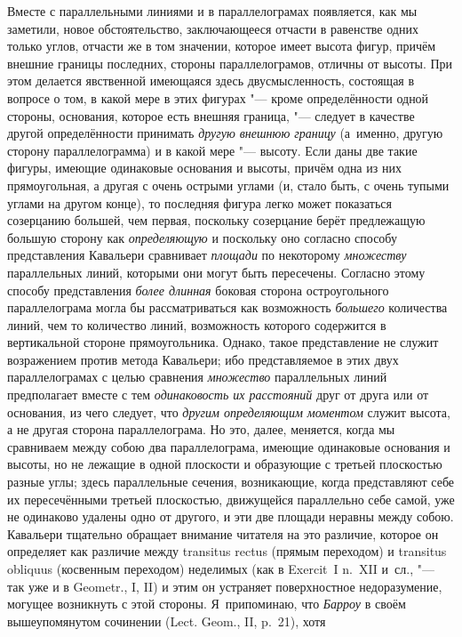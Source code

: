 Вместе с параллельными линиями и в параллелограмах появляется, как мы заметили,
новое обстоятельство, заключающееся отчасти в равенстве одних только углов,
отчасти же в том значении, которое имеет высота фигур, причём внешние границы
последних, стороны параллелограмов, отличны от высоты. При этом делается
явственной имеющаяся здесь двусмысленность, состоящая в вопросе о том, в какой
мере в этих фигурах "--- кроме определённости одной стороны, основания, которое
есть внешняя граница, "--- следует в качестве другой определённости принимать
{\em другую внешнюю границу} (а~именно, другую сторону параллелограмма) и в
какой мере "--- высоту. Если даны две такие фигуры, имеющие одинаковые
основания и высоты, причём одна из них прямоугольная, а другая с очень острыми
углами (и, стало быть, с очень тупыми углами на другом конце), то последняя
фигура легко может показаться созерцанию большей, чем первая, поскольку
созерцание берёт предлежащую большую сторону как {\em определяющую} и поскольку
оно согласно способу представления Кавальери сравнивает {\em площади} по
некоторому {\em множеству} параллельных линий, которыми они могут быть
пересечены. Согласно этому способу представления {\em более длинная} боковая
сторона остроугольного параллелограма могла бы рассматриваться как возможность
{\em большего} количества линий, чем то количество линий, возможность
которого содержится в вертикальной стороне прямоугольника. Однако, такое
представление не служит возражением против метода Кавальери; ибо представляемое
в этих двух параллелограмах с целью сравнения {\em множество} параллельных
линий предполагает вместе с тем {\em одинаковость их расстояний} друг от друга
или от основания, из чего следует, что {\em другим определяющим моментом}
служит высота, а не другая сторона параллелограма. Но это, далее, меняется,
когда мы сравниваем между собою два параллелограма, имеющие одинаковые
основания и высоты, но не лежащие в одной плоскости и образующие с третьей
плоскостью разные углы; здесь параллельные сечения, возникающие, когда
представляют себе их пересечёнными третьей плоскостью, движущейся параллельно
себе самой, уже не одинаково удалены одно от другого, и эти две площади неравны
между собою. Кавальери тщательно обращает внимание читателя на это различие,
которое он определяет как различие между transitus rectus (прямым переходом) и
transitus obliquus (косвенным переходом) неделимых (как в Exercit~I n.~XII
и~сл., "--- так уже и в Geometr., I, II) и этим он устраняет поверхностное
недоразумение, могущее возникнуть с этой стороны. Я~припоминаю, что
{\em Барроу} в своём вышеупомянутом сочинении (Lect. Geom., II, p.~21), хотя
